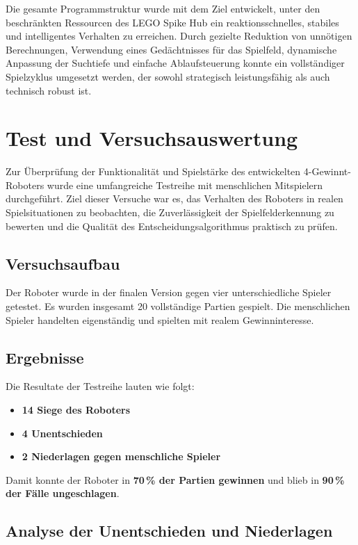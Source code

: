Die gesamte Programmstruktur wurde mit dem Ziel entwickelt, unter den beschränkten Ressourcen des LEGO Spike Hub ein reaktionsschnelles, stabiles und intelligentes Verhalten zu erreichen. Durch gezielte Reduktion von unnötigen Berechnungen, Verwendung eines Gedächtnisses für das Spielfeld, dynamische Anpassung der Suchtiefe und einfache Ablaufsteuerung konnte ein vollständiger Spielzyklus umgesetzt werden, der sowohl strategisch leistungsfähig als auch technisch robust ist.

\chapter{Test und Versuchsauswertung}

Zur Überprüfung der Funktionalität und Spielstärke des entwickelten 4-Gewinnt-Roboters wurde eine umfangreiche Testreihe mit menschlichen Mitspielern durchgeführt. Ziel dieser Versuche war es, das Verhalten des Roboters in realen Spielsituationen zu beobachten, die Zuverlässigkeit der Spielfelderkennung zu bewerten und die Qualität des Entscheidungsalgorithmus praktisch zu prüfen.

\section{Versuchsaufbau}

Der Roboter wurde in der finalen Version gegen vier unterschiedliche Spieler getestet. 
Es wurden insgesamt 20 vollständige Partien gespielt. Die menschlichen Spieler handelten eigenständig und spielten mit realem Gewinninteresse.

\section{Ergebnisse}

Die Resultate der Testreihe lauten wie folgt:

\begin{itemize}
	\item \textbf{14 Siege des Roboters}
	\item \textbf{4 Unentschieden}
	\item \textbf{2 Niederlagen gegen menschliche Spieler}
\end{itemize}

Damit konnte der Roboter in \textbf{70\,\% der Partien gewinnen} und blieb in \textbf{90\,\% der Fälle ungeschlagen}.

\section{Analyse der Unentschieden und Niederlagen}

